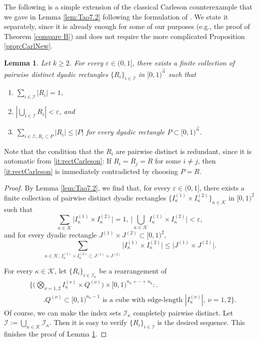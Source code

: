 \documentclass[11pt, reqno]{amsart}
\newtheorem{lemma}[theorem]{Lemma}
\theoremstyle{definition}
\theoremstyle{remark}
\numberwithin{equation}{section}
\begin{document}
The following is a simple extension of the classical Carleson counterexample \cite{Car} that we gave in Lemma \ref{lem:Tao7.2} following the formulation of \cite[Lemma 7.2]{Tao}. We state it separately, since it is already enough for some of our purposes (e.g., the proof of Theorem \ref{compare B}) and does not require the more complicated Proposition \ref{prop:CarlNew}.

\begin{lemma} \label{Carleson}
Let $k\geq 2$. For every $\varepsilon\in(0,1]$,
there exists a finite collection of
pairwise distinct dyadic rectangles $\{R_i\}_{i\in \mathscr I}$
in $[0,1)^{\vec n}$ such that
\begin{enumerate}[\rm(i)]
\item\label{it:Car-ex-i} $\sum_{i\in \mathscr I} |R_i|=1$,

\item\label{it:Car-ex-ii} $|\bigcup_{i\in \mathscr I} R_i|<\varepsilon$, and

\item\label{it:rectCarleson}
$\sum_{i\in \mathscr I,\,R_i\subset P} |R_i| \leq |P|$
for every dyadic rectangle $P\subset[0,1)^{\vec n}$.
\end{enumerate}
\end{lemma}

Note that the condition that the $R_i$ are pairwise distinct is redundant, since it is automatic from \eqref{it:rectCarleson}: If $R_i=R_j=R$ for some $i\neq j$, then \eqref{it:rectCarleson} is immediately contradicted by choosing $P=R$.

\begin{proof}
By Lemma \ref{lem:Tao7.2},
we find that, for every $\varepsilon\in(0,1]$,
there exists a finite collection of
pairwise distinct dyadic rectangles $\{I_\kappa^{(1)}\times I_\kappa^{(2)}\}_{\kappa\in \mathscr K}$
in $[0,1)^2$ such that
$$\sum_{\kappa\in \mathscr K} \big|I_\kappa^{(1)}\times I_\kappa^{(2)}\big|=1,\
\Big|\bigcup_{\kappa\in \mathscr K} I_\kappa^{(1)}\times I_\kappa^{(2)}\Big|<\varepsilon,$$
and
for every dyadic rectangle $J^{(1)}\times J^{(2)}\subset[0,1)^2$,
$$
\sum_{\kappa\in \mathscr K,\,
I_\kappa^{(1)}\times I_\kappa^{(2)}\subset J^{(1)}\times J^{(2)}}
\big|I_\kappa^{(1)}\times I_\kappa^{(2)}\big|
\leq \big|J^{(1)}\times J^{(2)}\big|.
$$

For every $\kappa\in \mathscr K$, let $\{R_i\}_{i\in \mathscr I_\kappa}$ be a rearrangement of
\begin{align*}
&\Big\{\Big( \bigotimes_{\nu=1,2}I_\kappa^{(\nu)}\times Q^{(\nu)}\Big)
\times [0,1)^{n_3+\cdots+n_k} :\Big. \\
&\qquad \Big. Q^{(\nu)}\subset [0,1)^{n_\nu-1}
\text{ is a cube with edge-length } |I_\kappa^{(\nu)}|,\ \nu=1,2\Big\}.
\end{align*}
Of course, we can make the index sets $\mathscr I_\kappa$ completely pairwise distinct.
Let $\mathscr I:=\bigcup_{\kappa\in\mathscr K} \mathscr I_\kappa$.
Then it is easy to verify $\{R_i\}_{i\in \mathscr I}$ is the desired sequence.
This finishes the proof of Lemma \ref{Carleson}.
\end{proof}
\end{document}
